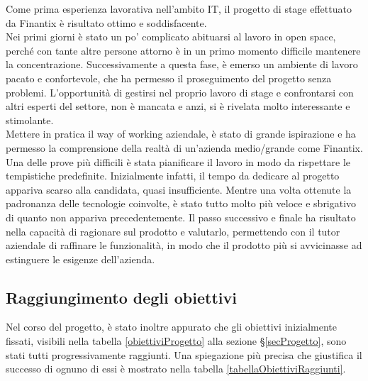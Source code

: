     Come prima esperienza lavorativa nell'ambito IT, il progetto di stage effettuato da Finantix è risultato ottimo e soddisfacente. \\
    Nei primi giorni è stato un po' complicato abituarsi al lavoro in open space, perché con tante altre persone attorno è in un primo momento difficile mantenere la concentrazione.
    Successivamente a questa fase, è emerso un ambiente di lavoro pacato e confortevole, che ha permesso il proseguimento del progetto senza problemi.
    L'opportunità di gestirsi nel proprio lavoro di stage e confrontarsi con altri esperti del settore, non è mancata e anzi, si è rivelata molto interessante e stimolante. \\
    Mettere in pratica il way of working aziendale, è stato di grande ispirazione e ha permesso la comprensione della realtà di un'azienda medio/grande come Finantix.
    Una delle prove più difficili è stata pianificare il lavoro in modo da rispettare le tempistiche predefinite.
    Inizialmente infatti, il tempo da dedicare al progetto appariva scarso alla candidata, quasi insufficiente.
    Mentre una volta ottenute la padronanza delle tecnologie coinvolte, è stato tutto molto più veloce e sbrigativo di quanto non appariva precedentemente.
    Il passo successivo e finale ha risultato nella capacità di ragionare sul prodotto e valutarlo, permettendo con il tutor aziendale di raffinare le funzionalità, in modo che il prodotto più si avvicinasse ad estinguere le esigenze dell'azienda.

    \subsection{Raggiungimento degli obiettivi}
    Nel corso del progetto, è stato inoltre appurato che gli obiettivi inizialmente fissati, visibili nella tabella \ref{obiettiviProgetto} alla sezione \S\ref{secProgetto}, sono stati tutti progressivamente raggiunti.
    Una spiegazione più precisa che giustifica il successo di ognuno di essi è mostrato nella tabella \ref{tabellaObiettiviRaggiunti}.

